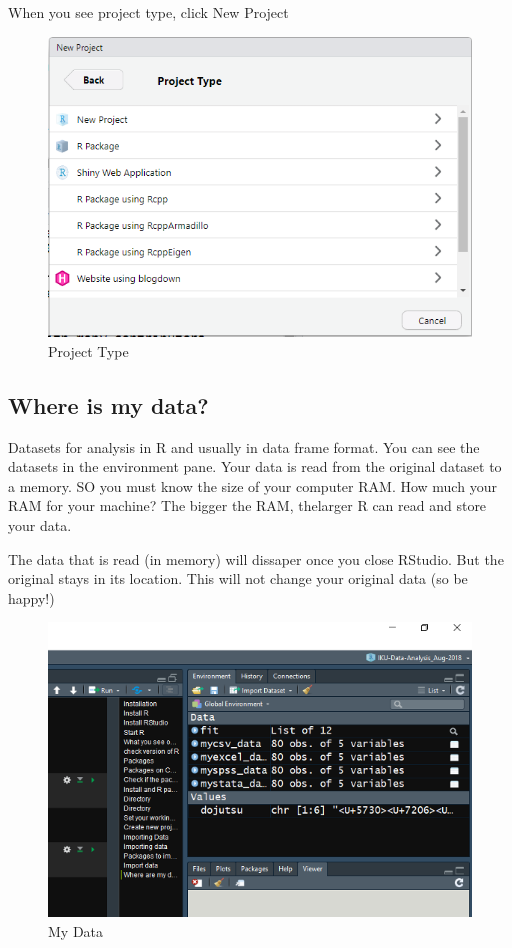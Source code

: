 \documentclass[
]{book}
\begin{document}
When you see project type, click New Project

\begin{figure}
\centering
\includegraphics{new_proj2.PNG}
\caption{Project Type}
\end{figure}

\hypertarget{where-is-my-data}{%
\subsection{Where is my data?}\label{where-is-my-data}}

Datasets for analysis in R and usually in data frame format. You can see the datasets in the environment pane. Your data is read from the original dataset to a memory. SO you must know the size of your computer RAM. How much your RAM for your machine? The bigger the RAM, thelarger R can read and store your data.

The data that is read (in memory) will dissaper once you close RStudio. But the original stays in its location. This will not change your original data (so be happy!)

\begin{figure}
\centering
\includegraphics{mydata.PNG}
\caption{My Data}
\end{figure}
\end{document}
